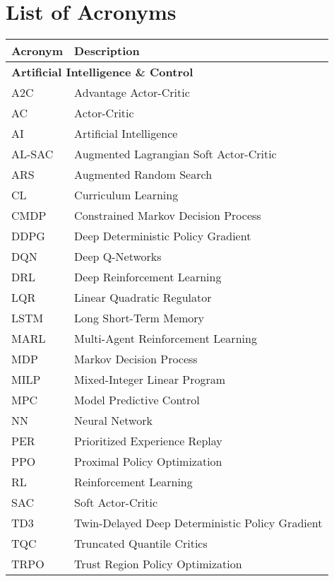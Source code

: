 

\section*{List of Acronyms} %

\begin{longtable}{ll}
\textbf{Acronym} & \textbf{Description} \\
\hline
\endhead %

\multicolumn{2}{l}{\textbf{Artificial Intelligence \& Control}} \\
A2C & Advantage Actor-Critic \\
AC & Actor-Critic \\
AI & Artificial Intelligence \\
AL-SAC & Augmented Lagrangian Soft Actor-Critic \\
ARS & Augmented Random Search \\
CL & Curriculum Learning \\
CMDP & Constrained Markov Decision Process \\
DDPG & Deep Deterministic Policy Gradient \\
DQN & Deep Q-Networks \\
DRL & Deep Reinforcement Learning \\
LQR & Linear Quadratic Regulator \\
LSTM & Long Short-Term Memory \\
MARL & Multi-Agent Reinforcement Learning \\
MDP & Markov Decision Process \\
MILP & Mixed-Integer Linear Program \\
MPC & Model Predictive Control \\
NN & Neural Network \\
PER & Prioritized Experience Replay \\
PPO & Proximal Policy Optimization \\
RL & Reinforcement Learning \\
SAC & Soft Actor-Critic \\
TD3 & Twin-Delayed Deep Deterministic Policy Gradient \\
TQC & Truncated Quantile Critics \\
TRPO & Trust Region Policy Optimization \\
\hline


\end{longtable}
